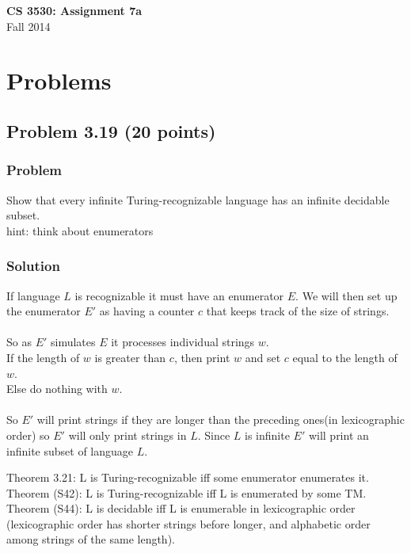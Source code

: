\documentclass{article}
\begin{document}
\begin{center}
\textbf{\Large CS 3530: Assignment 7a} \\[2mm]
Fall 2014
\end{center}

\raggedright

\section*{Problems}

\subsection*{Problem 3.19 (20 points)}

\subsubsection*{Problem}
Show that every infinite Turing-recognizable language has an infinite decidable subset. \\
hint: think about enumerators
\subsubsection*{Solution}

If language $L$ is recognizable it must have an enumerator $E$. 
We will then set up the enumerator $E'$ as having a counter $c$ that 
keeps track of the size of strings. \\ \ \\

So as $E'$ simulates $E$ it processes individual strings $w$. \\
If the length of $w$ is greater than $c$, then print $w$ and set $c$ 
equal to the length of $w$. \\
Else do nothing with $w$. \\ \ \\

So $E'$ will print strings if they are longer than the preceding ones(in lexicographic order)
so $E'$ will only print strings in $L$. 
Since $L$ is infinite $E'$ will print an infinite subset of language $L$.



\null
\vfill

Theorem 3.21: L is Turing-recognizable iff some enumerator enumerates it. \\
Theorem (S42): L is Turing-recognizable iff L is enumerated by some TM. \\
Theorem (S44): L is decidable iff L is enumerable in lexicographic order
(lexicographic order has shorter strings before longer, and
alphabetic order among strings of the same length).\\
\end{document}
